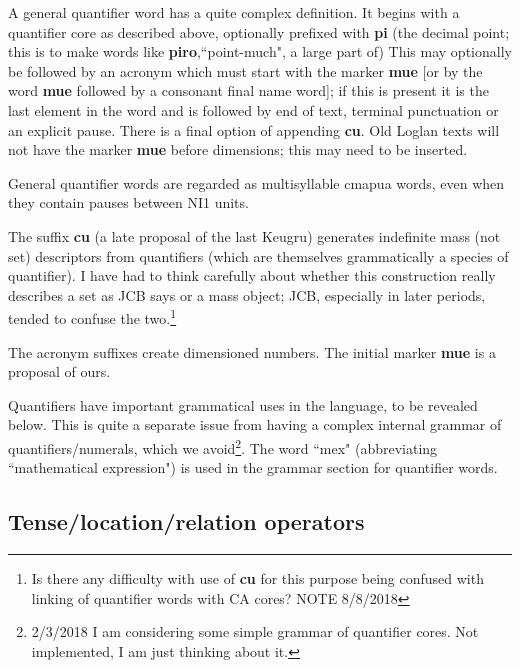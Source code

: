 \documentclass[12pt]{book}
\begin{document}
A general quantifier word has a quite complex definition.   It begins with a quantifier core as described above, optionally prefixed with {\bf pi} (the decimal point;  this is to make words like {\bf piro},``point-much",  a large part of)  This may optionally be followed by an acronym which must start with the marker {\bf mue} [or by the word {\bf mue} followed by a consonant final name word]; if this is present it is the last element in the word and is followed by end of text, terminal punctuation or an explicit pause.  There is a final option of appending {\bf cu}.   Old Loglan texts will not have the marker {\bf mue} before dimensions;  this may need to be inserted.

General quantifier words are regarded as multisyllable cmapua words, even when they contain pauses between NI1 units.

The suffix {\bf cu} (a late proposal of the last Keugru) generates indefinite mass  (not set) descriptors from quantifiers
(which are themselves grammatically a species of quantifier).  I have had to think carefully about whether this construction really describes a set as JCB says or a mass object; JCB, especially in later periods, tended to confuse the two.\footnote{Is there any difficulty with use of {\bf cu} for this purpose being confused with linking of quantifier words with CA cores?  NOTE 8/8/2018}

The acronym suffixes create dimensioned numbers.   The initial marker {\bf mue} is a proposal of ours.

Quantifiers have important grammatical uses in the language, to be revealed below.   This is quite a separate issue from having a complex internal grammar of quantifiers/numerals, which we avoid\footnote{2/3/2018 I am considering some simple grammar of quantifier cores.  Not implemented, I am just thinking about it.}.   The word ``mex" (abbreviating ``mathematical expression") is used in the grammar section for quantifier words.

\subsection{Tense/location/relation operators}
\end{document}
